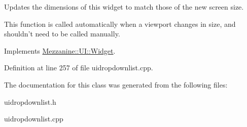 Updates the dimensions of this widget to match those of the new screen size. 

This function is called automatically when a viewport changes in size, and shouldn't need to be called manually. 

Implements \hyperlink{classMezzanine_1_1UI_1_1Widget_af23f919f2912ac10230953a848c9889c}{Mezzanine::UI::Widget}.



Definition at line 257 of file uidropdownlist.cpp.



The documentation for this class was generated from the following files:\begin{DoxyCompactItemize}
\item 
uidropdownlist.h\item 
uidropdownlist.cpp\end{DoxyCompactItemize}
